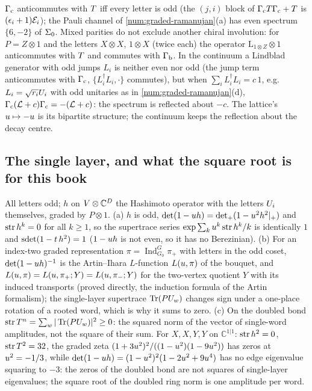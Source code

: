 \begin{observation}
\label{obs:chirality-needs-all-odd}
$\Gamma_{\mathrm c}$ anticommutes with $T$ iff every letter is odd (the $(j,i)$ block of $\Gamma_{\mathrm c}T\Gamma_{\mathrm c}+T$ is
$(\epsilon_i+1)\mathcal E_{i}$); the Pauli channel of \cref{num:graded-ramanujan}(a) has even spectrum $\{6,-2\}$ of
$\Sigma_0$. Mixed parities do not exclude another chiral involution: for $P = Z\otimes1$ and the letters
$X\otimes X$, $1\otimes X$ (twice each) the operator $\mathrm L_{1\otimes Z}\otimes1$ anticommutes with $T$
and commutes with $\Gamma_{\mathrm b}$. In the continuum a Lindblad generator with odd jumps $L_i$ is neither even nor odd
(the jump term anticommutes with $\Gamma_{\mathrm c}$, $\{L_i^\dagger L_i,\cdot\}$ commutes), but when
$\sum_iL_i^\dagger L_i = c\,1$, e.g.\ $L_i = \sqrt{r_i}U_{i}$ with odd unitaries as in
\cref{num:graded-ramanujan}(d), $\Gamma_{\mathrm c}(\mathcal L+c)\Gamma_{\mathrm c} = -(\mathcal L+c)$: the spectrum is reflected about $-c$. The
lattice's $u\mapsto-u$ is its bipartite structure; the continuum keeps the reflection about the decay centre.
\end{observation}

\subsection{The single layer, and what the square root is for this book}

\begin{proposition}
\label{prop:single-layer-odd}
All letters odd; $h$ on $V\otimes\mathbb C^{D}$ the Hashimoto operator with the letters $U_{i}$
themselves, graded by $P\otimes1$. (a) $h$ is odd, $\det(1-u h) = \det_+(1-u^2h^2|_+)$ and
$\operatorname{str} h^k = 0$ for all $k\ge1$, so the supertrace series $\exp\sum_ku^k\operatorname{str} h^k/k$ is identically $1$ and
$\operatorname{sdet}(1-t\,h^2) = 1$ ($1-u h$ is not even, so it has no Berezinian). (b) For an index-two graded
representation $\pi = \operatorname{Ind}_{G_0}^G\pi_+$ with letters in the odd coset, $\det(1-u h)^{-1}$
is the Artin--Ihara $L$-function $L(u,\pi)$ of the bouquet, and $L(u,\pi) = L(u,\pi_+;Y) =
L(u,\pi_-;Y)$ for the two-vertex quotient $Y$ with its induced transports (proved directly, the induction
formula of the Artin formalism); the single-layer supertrace $\operatorname{Tr}(PU_{w})$ changes sign under a one-place
rotation of a rooted word, which is why it sums to zero. (c) On the doubled bond $\operatorname{str}T^n =
\sum_w|\operatorname{Tr}(PU_{w})|^2\ge0$: the squared norm of the vector of single-word amplitudes, not the square of
their sum. For $X,X,Y,Y$ on $\mathbb C^{1|1}$: $\operatorname{str} h^2 = 0$, $\operatorname{str}T^2 = 32$, the graded zeta
$(1+3u^2)^2/((1-u^2)(1-9u^2))$ has zeros at $u^2 = -1/3$, while $\det(1-u h) =
(1-u^2)^2(1-2u^2+9u^4)$ has no edge eigenvalue squaring to $-3$: the zeros of the doubled bond are not
squares of single-layer eigenvalues; the square root of the doubled ring norm is one amplitude per word.
\end{proposition}

